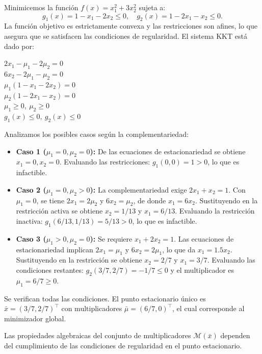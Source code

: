 \begin{example}\label{v1:exa:4.2.1}
 Minimicemos la función $f(x) = x_1^2 + 3x_2^2$ sujeta a:
 \[
 g_1(x) = 1 - x_1 - 2x_2 \le 0, \quad g_2(x) = 1 - 2x_1 - x_2 \le 0.
 \]
 La función objetivo es estrictamente convexa y las restricciones son afines, lo que asegura que se satisfacen las condiciones de regularidad. El sistema KKT está dado por:
 \begin{conditions}
 \conditem $2x_1 - \mu_1 - 2\mu_2 = 0$ \\
 \conditem $6x_2 - 2\mu_1 - \mu_2 = 0$ \\
 \conditem $\mu_1(1 - x_1 - 2x_2) = 0$ \\
 \conditem $\mu_2(1 - 2x_1 - x_2) = 0$ \\
 \conditem $\mu_1 \ge 0, \ \mu_2 \ge 0$ \\
 \conditem $g_1(x) \le 0, \ g_2(x) \le 0$
 \end{conditions}
 Analizamos los posibles casos según la complementariedad:
 \begin{itemize}
 \item \textbf{Caso 1 ($\mu_1 = 0, \mu_2 = 0$):} De las ecuaciones de estacionariedad se obtiene $x_1 = 0, x_2 = 0$. Evaluando las restricciones: $g_1(0,0) = 1 > 0$, lo que es infactible.
 \item \textbf{Caso 2 ($\mu_1 = 0, \mu_2 > 0$):} La complementariedad exige $2x_1 + x_2 = 1$. Con $\mu_1 = 0$, se tiene $2x_1 = 2\mu_2$ y $6x_2 = \mu_2$, de donde $x_1 = 6x_2$. Sustituyendo en la restricción activa se obtiene $x_2 = 1/13$ y $x_1 = 6/13$. Evaluando la restricción inactiva: $g_1(6/13, 1/13) = 5/13 > 0$, lo que es infactible.
 \item \textbf{Caso 3 ($\mu_1 > 0, \mu_2 = 0$):} Se requiere $x_1 + 2x_2 = 1$. Las ecuaciones de estacionariedad implican $2x_1 = \mu_1$ y $6x_2 = 2\mu_1$, lo que da $x_1 = 1.5 x_2$. Sustituyendo en la restricción se obtiene $x_2 = 2/7$ y $x_1 = 3/7$. Evaluando las condiciones restantes: $g_2(3/7, 2/7) = -1/7 \le 0$ y el multiplicador es $\mu_1 = 6/7 \ge 0$.
 \end{itemize}
 Se verifican todas las condiciones. El punto estacionario único es $\bar{x} = (3/7, 2/7)^\top$ con multiplicadores $\bar{\mu} = (6/7, 0)^\top$, el cual corresponde al minimizador global.
\end{example}

Las propiedades algebraicas del conjunto de multiplicadores $\mathcal{M}(\bar{x})$ dependen del cumplimiento de las condiciones de regularidad en el punto estacionario.


